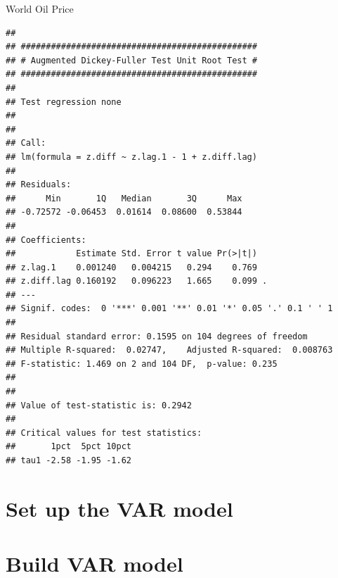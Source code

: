 \documentclass[11pt,preprint, authoryear]{elsarticle}
\numberwithin{equation}{section}
\numberwithin{figure}{section}
\numberwithin{table}{section}
\begin{document}
World Oil Price

\begin{verbatim}
## 
## ############################################### 
## # Augmented Dickey-Fuller Test Unit Root Test # 
## ############################################### 
## 
## Test regression none 
## 
## 
## Call:
## lm(formula = z.diff ~ z.lag.1 - 1 + z.diff.lag)
## 
## Residuals:
##      Min       1Q   Median       3Q      Max 
## -0.72572 -0.06453  0.01614  0.08600  0.53844 
## 
## Coefficients:
##            Estimate Std. Error t value Pr(>|t|)  
## z.lag.1    0.001240   0.004215   0.294    0.769  
## z.diff.lag 0.160192   0.096223   1.665    0.099 .
## ---
## Signif. codes:  0 '***' 0.001 '**' 0.01 '*' 0.05 '.' 0.1 ' ' 1
## 
## Residual standard error: 0.1595 on 104 degrees of freedom
## Multiple R-squared:  0.02747,    Adjusted R-squared:  0.008763 
## F-statistic: 1.469 on 2 and 104 DF,  p-value: 0.235
## 
## 
## Value of test-statistic is: 0.2942 
## 
## Critical values for test statistics: 
##       1pct  5pct 10pct
## tau1 -2.58 -1.95 -1.62
\end{verbatim}

\hypertarget{set-up-the-var-model}{%
\section{Set up the VAR model}\label{set-up-the-var-model}}

\hypertarget{build-var-model}{%
\section{Build VAR model}\label{build-var-model}}
\end{document}

